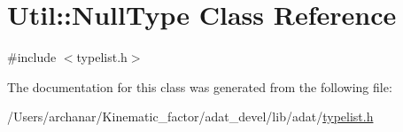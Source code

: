 \hypertarget{classUtil_1_1NullType}{}\section{Util\+:\+:Null\+Type Class Reference}
\label{classUtil_1_1NullType}


{\ttfamily \#include $<$typelist.\+h$>$}



The documentation for this class was generated from the following file\+:\begin{DoxyCompactItemize}
\item 
/\+Users/archanar/\+Kinematic\+\_\+factor/adat\+\_\+devel/lib/adat/\mbox{\hyperlink{lib_2adat_2typelist_8h}{typelist.\+h}}\end{DoxyCompactItemize}
